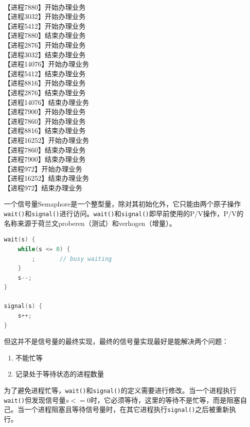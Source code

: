 \begin{tcolorbox}
	 \\
	【进程7880】开始办理业务 \\
	【进程3032】开始办理业务 \\
	【进程5412】开始办理业务 \\
	【进程7880】结束办理业务 \\
	【进程2876】开始办理业务 \\
	【进程3032】结束办理业务 \\
	【进程14076】开始办理业务 \\
	【进程5412】结束办理业务 \\
	【进程8816】开始办理业务 \\
	【进程2876】结束办理业务 \\
	【进程14076】结束办理业务 \\
	【进程7900】开始办理业务 \\
	【进程7860】开始办理业务 \\
	【进程8816】结束办理业务 \\
	【进程16252】开始办理业务 \\
	【进程7860】结束办理业务 \\
	【进程7900】结束办理业务 \\
	【进程972】开始办理业务 \\
	【进程16252】结束办理业务 \\
	【进程972】结束办理业务
\end{tcolorbox}

一个信号量Semaphore是一个整型量，除对其初始化外，它只能由两个原子操作\lstinline|wait()|和\lstinline|signal()|进行访问。\lstinline|wait()|和\lstinline|signal()|即早前使用的P/V操作，P/V的名称来源于荷兰文proberen（测试）和verhogen（增量）。

\begin{lstlisting}[language=C]
wait(s) {
	while(s <= 0) {
		;		// busy waiting
	}
	s--;
}

signal(s) {
	s++;
}
\end{lstlisting}

但这并不是信号量的最终实现，最终的信号量实现最好是能解决两个问题：

\begin{enumerate}
	\item 不能忙等
	\item 记录处于等待状态的进程数量
\end{enumerate}

为了避免进程忙等，\lstinline|wait()|和\lstinline|signal()|的定义需要进行修改。当一个进程执行\lstinline|wait()|但发现信号量$ s <= 0 $时，它必须等待，这里的等待不是忙等，而是阻塞自己。当一个进程阻塞且等待信号量时，在其它进程执行\lstinline|signal()|之后被重新执行。 \\

